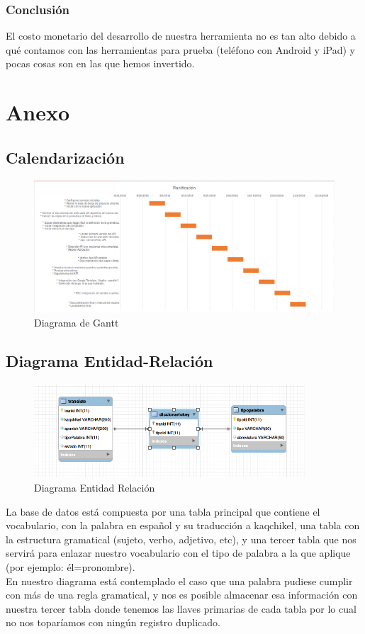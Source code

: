 \documentclass[a4paper,openright,11pt]{article}
\begin{document}
\subsubsection{Conclusión}
El costo monetario del desarrollo de nuestra herramienta no es tan alto debido a qué contamos con las herramientas para prueba (teléfono con Android y iPad) y pocas cosas son en las que hemos invertido.
\newpage

\section{Anexo}
\subsection{Calendarización}
\begin{figure}[h]
  \centering
    \includegraphics[width=1.0\textwidth]{Gantt}
  \caption{Diagrama de Gantt}
  \label{fig:gantt}
\end{figure}

\newpage
\subsection{Diagrama Entidad-Relación}
\begin{figure}[h]
	\centering
	\includegraphics[width=0.9\textwidth]{er}
	\caption{Diagrama Entidad Relación}
	\label{fig:er}
\end{figure}
La base de datos está compuesta por una tabla principal que contiene el vocabulario, con la palabra en español y su traducción a kaqchikel, una tabla con la estructura gramatical (sujeto, verbo, adjetivo, etc), y una tercer tabla que nos servirá para enlazar nuestro vocabulario con el tipo de palabra a la que aplique (por ejemplo: él=pronombre).\\
En nuestro diagrama está contemplado el caso que una palabra pudiese cumplir con más de una regla gramatical, y nos es posible almacenar esa información con nuestra tercer tabla donde tenemos las llaves primarias de cada tabla por lo cual no nos toparíamos con ningún registro duplicado.
\end{document}

